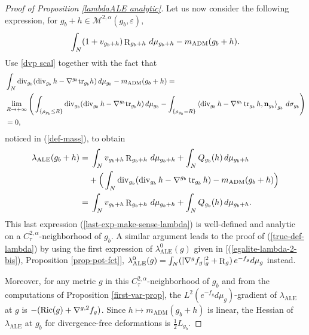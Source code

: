 \documentclass[a4paper,11pt,reqno]{amsart}
\def\Ric{\mathop{\rm Ric}\nolimits}
\def\tr{\mathop{\rm tr}\nolimits}
\def\div{\mathop{\rm div}\nolimits}
\def\Ric{\mathop{\rm Ric}\nolimits}
\def\tr{\mathop{\rm tr}\nolimits}
\def\div{\mathop{\rm div}\nolimits}
\def\R{\mathop{\rm R}\nolimits}
\numberwithin{equation}{section}
\begin{document}
\begin{proof}[Proof of Proposition \ref{lambdaALE analytic}]
		Let us now consider the following expression, for $g_b+h\in\mathcal{M}^{2,\alpha}(g_b,\varepsilon)$, $$ \int_N (1+v_{g_b+h})\R_{g_b+h}\,d\mu_{g_b+h} - m_{\operatorname{ADM}}(g_b+h). $$ Use \eqref{dvp scal} together with the fact that 
		\begin{equation*}
		\begin{split}
		&\int_N\div_{g_b}( \div_{g_b}h - \nabla^{g_b}\textup{tr}_{g_b}h)\,d\mu_{g_b} - m_{\operatorname{ADM}}(g_b+h) =\\
		&\lim_{R\rightarrow+\infty}\Bigg(\int_{\{\rho_{g_b}\leq R\}}\div_{g_b}( \div_{g_b}h - \nabla^{g_b}\textup{tr}_{g_b}h)\,d\mu_{g_b}-\int_{\{\rho_{g_b}=R\}}\left<\div_{g_b}h-\nabla^{g_b}\tr_{g_b}h,\mathbf{n}_{g_b}\right>_{g_b}\,d\sigma_{g_b}\Bigg)\\
		&=0,
		\end{split}
		\end{equation*}
		 noticed in (\ref{def-mass}), to obtain
		\begin{align}
		\lambda_{\operatorname{ALE}}(g_b+h)=&\;\int_N v_{g_b+h}\R_{g_b+h}\,d\mu_{g_b+h} + \int_N Q_{g_b}(h)\,d\mu_{g_b+h} \\
		&+ \Big(\int_N\div_{g_b}( \div_{g_b}h - \nabla^{g_b}\tr_{g_b}h) - m_{\operatorname{ADM}}(g_b+h) \Big)\\
		=&\; \int_N v_{g_b+h}\R_{g_b+h}\,d\mu_{g_b+h} + \int_N Q_{g_b}(h)\,d\mu_{g_b+h}.\label{last-exp-make-sense-lambda}
		\end{align}
		This last expression (\ref{last-exp-make-sense-lambda}) is well-defined and analytic on a $C^{2,\alpha}_\tau$-neighborhood of $g_b$. A similar argument leads to the proof of (\ref{true-def-lambda}) by using the first expression of $\lambda_{\operatorname{ALE}}^0(g)$ given in [(\ref{egalite-lambda-2-bis}), Proposition \ref{prop-pot-fct}], $\lambda_{\operatorname{ALE}}^0(g)=\int_N(|\nabla^gf_g|^2_g+\R_g)\,e^{-f_{g}}d\mu_g$ instead.
		
		 Moreover, for any metric $g$ in this $C^{2,\alpha}_\tau$-neighborhood of $g_b$ and from the computations of Proposition \ref{first-var-prop}, the $L^2(e^{-f_g}d\mu_g)$-gradient of $\lambda_{\operatorname{ALE}}$ at $g$ is $-(\Ric(g)+\nabla^{g,2} f_g)$. Since $h\mapsto m_{\operatorname{ADM}}(g_b+h)$ is linear, the Hessian of $\lambda_{\operatorname{ALE}}$ at $g_b$ for divergence-free deformations is $\frac{1}{2}L_{g_b}$. 
		 

\end{proof}
\end{document}
